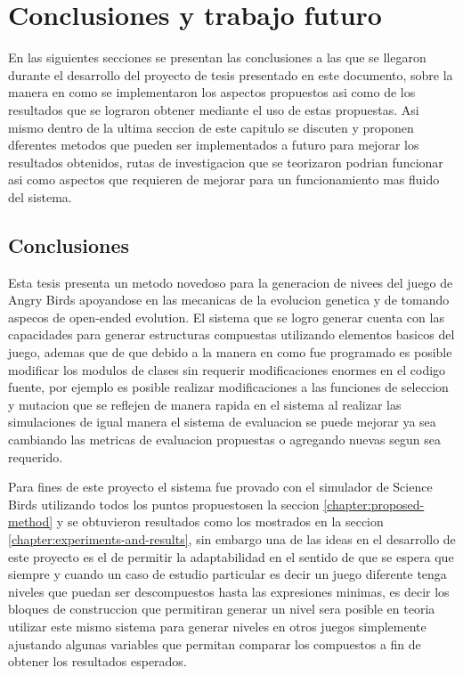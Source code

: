 \chapter{Conclusiones y trabajo futuro}
\label{chapter:conclusions-and-future-work}

En las siguientes secciones se presentan las conclusiones a las que se llegaron
durante el desarrollo del proyecto de tesis presentado en este documento, sobre
la manera en como se implementaron los aspectos propuestos asi como de los
resultados que se lograron obtener mediante el uso de estas propuestas. Asi
mismo dentro de la ultima seccion de este capitulo se discuten y proponen
dferentes metodos que pueden ser implementados a futuro para mejorar los
resultados obtenidos, rutas de investigacion que se teorizaron podrian funcionar
asi como aspectos que requieren de mejorar para un funcionamiento mas fluido del
sistema.

\section{Conclusiones}
\label{section:conclusions}

Esta tesis presenta un metodo novedoso para la generacion de nivees del juego de
Angry Birds apoyandose en las mecanicas de la evolucion genetica y de tomando
aspecos de open-ended evolution. El sistema que se logro generar cuenta con las
capacidades para generar estructuras compuestas utilizando elementos basicos del
juego, ademas que de que debido a la manera en como fue programado es posible
modificar los modulos de clases sin requerir modificaciones enormes en el codigo
fuente, por ejemplo es posible realizar modificaciones a las funciones de
seleccion y mutacion que se reflejen de manera rapida en el sistema al realizar
las simulaciones de igual manera el sistema de evaluacion se puede mejorar ya
sea cambiando las metricas de evaluacion propuestas o agregando nuevas segun sea
requerido.

Para fines de este proyecto el sistema fue provado con el simulador de Science
Birds utilizando todos los puntos propuestosen la seccion
\ref{chapter:proposed-method} y se obtuvieron resultados como los mostrados en
la seccion \ref{chapter:experiments-and-results}, sin embargo una de las ideas
en el desarrollo de este proyecto es el de permitir la adaptabilidad en el
sentido de que se espera que siempre y cuando un caso de estudio particular es
decir un juego diferente tenga niveles que puedan ser descompuestos hasta las
expresiones minimas, es decir los bloques de construccion que permitiran generar
un nivel sera posible en teoria utilizar este mismo sistema para generar niveles
en otros juegos simplemente ajustando algunas variables que permitan comparar
los compuestos a fin de obtener los resultados esperados.

